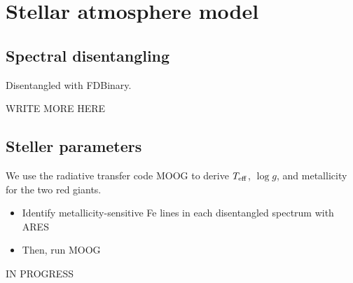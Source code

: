 \section{Stellar atmosphere model}\label{atm}

\subsection{Spectral disentangling}\label{disentangle}
Disentangled with FDBinary.

WRITE MORE HERE

\subsection{Steller parameters}\label{parameters}
We use the radiative transfer code MOOG \citep{sne73} to derive $T_{\rm{eff}}$, $\log g$, and metallicity for the two red giants.
\begin{itemize}
\item Identify metallicity-sensitive Fe lines in each disentangled spectrum with ARES
\item Then, run MOOG
\end{itemize}

IN PROGRESS
